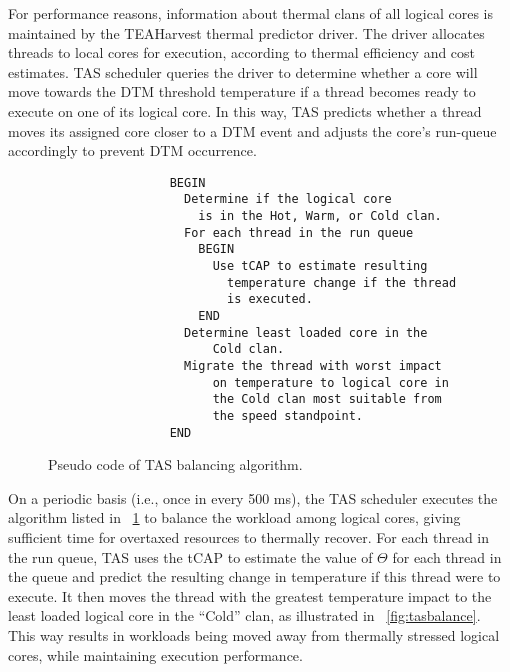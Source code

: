 For performance reasons, information about thermal clans of all logical
cores is maintained by the TEAHarvest thermal predictor driver.  The
driver allocates threads to local cores for execution, according to
thermal efficiency and cost estimates.  TAS scheduler queries the driver
to determine whether a core will move towards the DTM threshold
temperature if a thread becomes ready to execute on one of its logical
core.  In this way, TAS predicts whether a thread moves its assigned
core closer to a DTM event and adjusts the core's run-queue accordingly
to prevent DTM occurrence.

{\setlength{\abovecaptionskip}{0ex}
\begin{figure}[t] 
\centering
\begin{verbatim} 
                 BEGIN 
                   Determine if the logical core 
                     is in the Hot, Warm, or Cold clan.  
                   For each thread in the run queue 
                     BEGIN 
                       Use tCAP to estimate resulting 
                         temperature change if the thread 
                         is executed. 
                     END 
                   Determine least loaded core in the
                       Cold clan.  
                   Migrate the thread with worst impact 
                       on temperature to logical core in
                       the Cold clan most suitable from
                       the speed standpoint.  
                 END
\end{verbatim}
\caption{Pseudo code of TAS balancing algorithm.}
\label{fig:tascode}
\end{figure}
} 
On a periodic basis (i.e., once in every 500 ms), the TAS scheduler
executes the algorithm listed in \figurename~\ref{fig:tascode} to
balance the workload among logical cores, giving sufficient time for
overtaxed resources to thermally recover.  For each thread in the run
queue, TAS uses the tCAP to estimate the value of $\Theta$ for each
thread in the queue and predict the resulting change in temperature if
this thread were to execute.  It then moves the thread with the greatest
temperature impact to the least loaded logical core in the ``Cold''
clan, as illustrated in \figurename~\ref{fig:tasbalance}.  This way
results in workloads being moved away from thermally stressed logical
cores, while maintaining execution performance.

